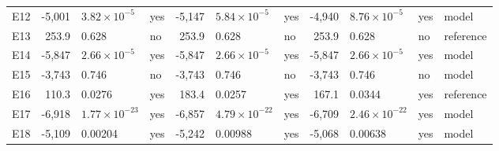 \begin{table}[htbp]
\begin{tabular}{lrllrllrlll}
E12 & -5,001 & $3.82 \times 10^{-5}$ & yes & -5,147 & $5.84 \times 10^{-5}$ & yes & -4,940 & $8.76 \times 10^{-5}$ & yes & model \\
E13 & 253.9 & 0.628 & no & 253.9 & 0.628 & no & 253.9 & 0.628 & no & reference \\
E14 & -5,847 & $2.66 \times 10^{-5}$ & yes & -5,847 & $2.66 \times 10^{-5}$ & yes & -5,847 & $2.66 \times 10^{-5}$ & yes & model \\
E15 & -3,743 & 0.746 & no & -3,743 & 0.746 & no & -3,743 & 0.746 & no & model \\
E16 & 110.3 & 0.0276 & yes & 183.4 & 0.0257 & yes & 167.1 & 0.0344 & yes & reference \\
E17 & -6,918 & $1.77 \times 10^{-23}$ & yes & -6,857 & $4.79 \times 10^{-22}$ & yes & -6,709 & $2.46 \times 10^{-22}$ & yes & model \\
E18 & -5,109 & 0.00204 & yes & -5,242 & 0.00988 & yes & -5,068 & 0.00638 & yes & model \\
\bottomrule
\end{tabular}
\end{table}

